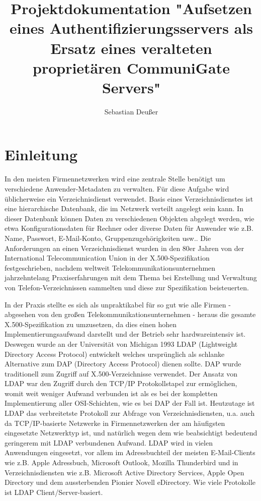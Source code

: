 \documentclass[11pt,a4paper,titlepage=firstiscover,headsepline]{scrartcl} %
\title{Projektdokumentation "Aufsetzen eines Authentifizierungsservers als Ersatz eines veralteten proprietären CommuniGate Servers"}
\author{Sebastian Deußer}
\begin{document}
\pagestyle{empty}
\maketitle %

\tableofcontents
\newpage
\setcounter{page}{1}  %
\pagestyle{scrheadings}

\section{Einleitung}
In den meisten Firmennetzwerken wird eine zentrale Stelle benötigt um verschiedene Anwender-Metadaten zu verwalten. Für diese Aufgabe wird üblicherweise ein Verzeichnisdienst verwendet. Basis eines Verzeichnisdienstes ist eine hierarchische Datenbank, die im Netzwerk verteilt angelegt sein kann. In dieser Datenbank können Daten zu verschiedenen Objekten abgelegt werden, wie etwa Konfigurationsdaten für Rechner oder diverse Daten für Anwender wie z.B. Name, Passwort, E-Mail-Konto, Gruppenzugehörigkeiten usw.. Die Anforderungen an einen Verzeichnisdienst wurden in den 80er Jahren von der International Telecommunication Union in der X.500-Spezifikation festgeschrieben, nachdem weltweit Telekommunikationsunternehmen jahrzehntelang Praxiserfahrungen mit dem Thema bei Erstellung und Verwaltung von Telefon-Verzeichnissen sammelten und diese zur Spezifikation beisteuerten.

In der Praxis stellte es sich als unpraktikabel für so gut wie alle Firmen - abgesehen von den großen Telekommunikationsunternehmen - heraus die gesamte X.500-Spezifikation zu umzusetzen, da dies einen hohen Implementierungsaufwand darstellt und der Betrieb sehr hardwareintensiv ist. Deswegen wurde an der Universität von Michigan 1993 LDAP (Lightweight Directory Access Protocol) entwickelt welches ursprünglich als schlanke Alternative zum DAP (Directory Access Protocol) dienen sollte. DAP wurde traditionell zum Zugriff auf X.500-Verzeichnisse verwendet. Der Ansatz von LDAP war den Zugriff durch den TCP/IP Protokollstapel zur ermöglichen, womit weit weniger Aufwand verbunden ist als es bei der kompletten Implementierung aller OSI-Schichten, wie es bei DAP der Fall ist. Heutzutage ist LDAP das verbreitetste Protokoll zur Abfrage von Verzeichnisdiensten, u.a. auch da TCP/IP-basierte Netzwerke in Firmennetzwerken der am häufigsten eingesetzte Netzwerktyp ist, und natürlich wegen dem wie beabsichtigt bedeutend geringerem mit LDAP verbundenen Aufwand. LDAP wird in vielen Anwendungen eingesetzt, vor allem im Adressbuchteil der meisten E-Mail-Clients wie z.B. Apple Adressbuch, Microsoft Outlook, Mozilla Thunderbird und in Verzeichnisdiensten wie z.B. Microsoft Active Directory Services, Apple Open Directory und dem aussterbenden Pionier Novell eDirectory. Wie viele Protokolle ist LDAP Client/Server-basiert.
\end{document}
